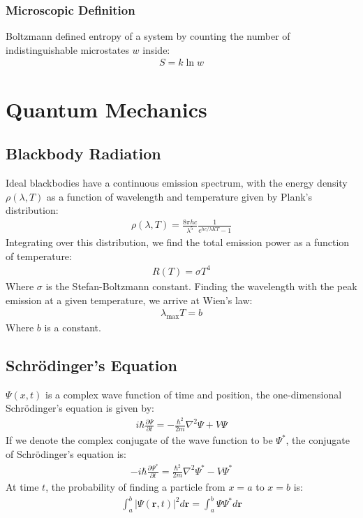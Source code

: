 \documentclass[a4paper]{article}
\newcommand{\ve}[1]{
  \ensuremath{\bm{#1}}}	               %
\newcommand{\cc}[1]{
  \ensuremath{#1^{\ast}}}              %
\newcommand{\pd}[2]{
  \ensuremath{
    \frac{\partial #1}{\partial #2} }} %
\begin{document}
\begin{multicols*}{2}
\subsubsection{Microscopic Definition}
Boltzmann defined entropy of a system by counting the number of
indistinguishable microstates $w$ inside:
\begin{align*}
  S = k \ln w
\end{align*}

\section{Quantum Mechanics}
\subsection{Blackbody Radiation}
Ideal blackbodies have a continuous emission spectrum, with the energy density
$\rho (\lambda, T)$ as a function of wavelength and temperature given by Plank's
distribution:
\begin{align*}
  \rho (\lambda, T) = \frac{8\pi h c}{\lambda^5} \frac{1}{e^{hc/\lambda KT} - 1}
\end{align*}
Integrating over this distribution, we find the total emission power as a
function of temperature:
\begin{align*}
  R(T) = \sigma T^4
\end{align*}
Where $\sigma$ is the Stefan-Boltzmann constant. Finding the wavelength with the peak emission at a given temperature, we arrive at Wien's law:
\begin{align*}
  \lambda_\text{max} T = b
\end{align*}
Where $b$ is a constant.
\subsection{Schr\"{o}dinger's Equation}
$\Psi(x, t)$ is a complex wave function of time and position, the
one-dimensional Schr\"{o}dinger's equation is given by:
\begin{align*}
  i \hbar \pd{\Psi}{t} = - \frac{\hbar^2}{2m} \nabla^2 \Psi + V\Psi
\end{align*}
If we denote the complex conjugate of the wave function to be $\cc{\Psi}$, the
conjugate of Schr\"{o}dinger's equation is:
\begin{align*}
  -i \hbar \pd{\cc{\Psi}}{t} = \frac{\hbar^2}{2m} \nabla^2 \cc{\Psi} -
  V\cc{\Psi}
\end{align*}
At time $t$, the probability of finding a particle from $x=a$ to $x=b$ is:
\begin{align*}
  \int_{a}^{b} |\Psi(\ve{r}, t)|^2 d\ve{r} = \int_{a}^{b}\Psi\cc{\Psi}d\ve{r}
\end{align*}

\end{multicols*}
\end{document}
